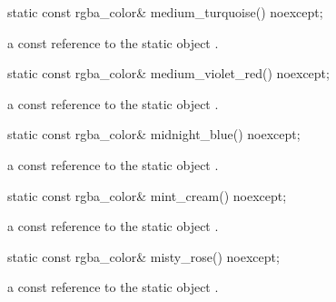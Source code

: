 \begin{itemdecl}
    static const rgba_color& medium_turquoise() noexcept;
\end{itemdecl}
\begin{itemdescr}
    \pnum
    \returns
    a const reference to the static  object .
\end{itemdescr}

\begin{itemdecl}
    static const rgba_color& medium_violet_red() noexcept;
\end{itemdecl}
\begin{itemdescr}
    \pnum
    \returns
    a const reference to the static  object .
\end{itemdescr}

\begin{itemdecl}
    static const rgba_color& midnight_blue() noexcept;
\end{itemdecl}
\begin{itemdescr}
    \pnum
    \returns
    a const reference to the static  object .
\end{itemdescr}

\begin{itemdecl}
    static const rgba_color& mint_cream() noexcept;
\end{itemdecl}
\begin{itemdescr}
    \pnum
    \returns
    a const reference to the static  object .
\end{itemdescr}

\begin{itemdecl}
    static const rgba_color& misty_rose() noexcept;
\end{itemdecl}
\begin{itemdescr}
    \pnum
    \returns
    a const reference to the static  object .
\end{itemdescr}

